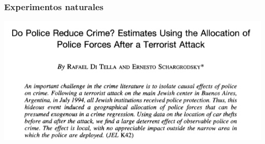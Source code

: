 \documentclass{beamer}
\begin{document}
\begin{frame} 
    \frametitle{Experimentos naturales}
    \begin{center}
        \includegraphics[scale=0.8]{../Figures/Do_Police_Induce_Crime.png}
    \end{center}
\end{frame}
\end{document}
